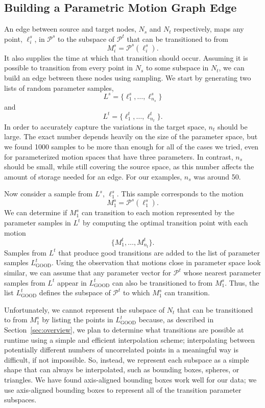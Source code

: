 \documentclass[10pt,twocolumn]{article}
\begin{document}
\subsection{Building a Parametric Motion Graph Edge}

An edge between source and target nodes, $N_s$ and $N_t$ respectively, maps any point, $\ell_i^s$, in $\mathcal{P}^s$ to the subspace of $\mathcal{P}^t$ that can be transitioned to from
\[
M_i^s = \mathcal{P}^s(\ell_i^s).
\]
It also supplies the time at which that transition should occur. Assuming it is possible to transition from every point in $N_s$ to some subspace in $N_t$, we can build an edge between these nodes using sampling. We start by generating two lists of random parameter samples,
\[
L^s = \{\ell_1^s,\ldots,\ell_{n_s}^s\}
\]
and
\[
L^t = \{\ell_1^t,\ldots,\ell_{n_t}^t\}.
\]
In order to accurately capture the variations in the target space, $n_t$ should be large. The exact number depends heavily on the size of the parameter space, but we found 1000 samples to be more than enough for all of the cases we tried, even for parameterized motion spaces that have three parameters. In contrast, $n_s$ should be small, while still covering the source space, as this number affects the amount of storage needed for an edge. For our examples, $n_s$ was around 50.

Now consider a sample from $L^s$, $\ell_1^s$. This sample corresponds to the motion
\[
M_1^s = \mathcal{P}^s(\ell_1^s).
\]
We can determine if $M_1^s$ can transition to each motion represented by the parameter samples in $L^t$ by computing the optimal transition point with each motion
\[
\{M_1^t,\ldots,M_{n_t}^t\}.
\]
Samples from $L^t$ that produce good transitions are added to the list of parameter samples $L_{\mathrm{GOOD}}^t$. Using the observation that motions close in parameter space look similar, we can assume that any parameter vector for $\mathcal{P}^t$ whose nearest parameter samples from $L^t$ appear in $L_{\mathrm{GOOD}}^t$ can also be transitioned to from $M_1^s$. Thus, the list $L_{\mathrm{GOOD}}^t$ defines the subspace of $\mathcal{P}^t$ to which $M_1^s$ can transition.

Unfortunately, we cannot represent the subspace of $N_t$ that can be transitioned to from $M_1^s$ by listing the points in $L_{\mathrm{GOOD}}^t$ because, as described in Section~\ref{sec:overview}, we plan to determine what transitions are possible at runtime using a simple and efficient interpolation scheme; interpolating between potentially different numbers of uncorrelated points in a meaningful way is difficult, if not impossible. So, instead, we represent each subspace as a simple shape that can always be interpolated, such as bounding boxes, spheres, or triangles. We have found axis-aligned bounding boxes work well for our data; we use axis-aligned bounding boxes to represent all of the transition parameter subspaces.
\end{document}
